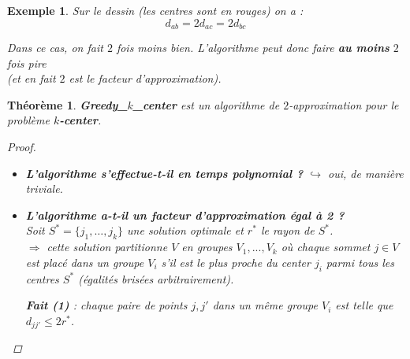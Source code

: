 \documentclass{article}
\newtheorem{exemple}{Exemple}[section]
\newtheorem{thm}{Th\'eor\`eme}[section]
\newtheorem{proof}{Preuve}[section]
\begin{document}
\begin{sffamily}
\begin{exemple}
Sur le dessin \textit{(les centres sont en rouges)} on a : $$d_{ab} = 2 d_{ac} = 2 d_{bc} $$

Dans ce cas, on fait $2$ fois moins bien. L'algorithme peut donc faire \textbf{au moins} $2$ fois pire\\\indent (et en fait $2$ est
le facteur d'approximation).
\end{exemple}

\newpage

\begin{thm} \textbf{Greedy\_$k$\_center} est un algorithme de $2$-approximation pour le problème \textbf{$k$-center}.
\begin{proof}$ $\\
\begin{itemize}
\item \textbf{L'algorithme s'effectue-t-il en temps polynomial ?} $\hookrightarrow$ oui, de manière triviale.
\item \textbf{L'algorithme a-t-il un facteur d'approximation égal à 2 ?} \\
Soit $S^* = \{j_1,\ldots ,j_k\}$ une solution optimale et $r^*$ le rayon de $S^*$.\\
$\Rightarrow$ cette solution partitionne $V$ en groupes $V_1,...,V_k$ où chaque sommet $j\in V$ est placé dans un groupe $V_i$ s'il est 
le plus proche du center $j_i$ parmi tous les centres $S^*$ (égalités brisées arbitrairement). \\
\begin{center}
	\textbf{Fait (1)} : chaque paire de points $j,j'$ dans un même groupe $V_i$ est telle que $d_{jj'} \leq 2r^*$.\\
\end{center}


\end{itemize}
\end{proof}
\end{thm}
\end{sffamily}
\end{document}
